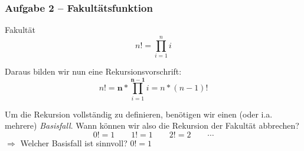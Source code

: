 \documentclass{beamer}
\begin{document}
\begin{frame}\frametitle{Aufgabe 2 -- Fakultätsfunktion}
	Fakultät
	\begin{equation*}
		n! = \prod_{i=1}^n i
	\end{equation*}
	
	\medskip
	\pause
	
	Daraus bilden wir nun eine Rekursionsvorschrift:
	\begin{equation*}
		n! = \boldsymbol{n} * \prod_{i=1}^{\boldsymbol{n-1}} i= n * (n-1)!
	\end{equation*}
	
	\medskip
	\pause
	
	Um die Rekursion vollständig zu definieren, benötigen wir einen (oder i.a. mehrere) \emph{Basisfall}. Wann können wir also die Rekursion der Fakultät abbrechen?
	\begin{equation}
	0 ! = 1 \qquad 1 ! = 1 \qquad 2! = 2 \qquad \cdots
	\end{equation}
	$\Rightarrow$ Welcher Basisfall ist sinnvoll? \qquad $0! = 1$
\end{frame}
\end{document}
